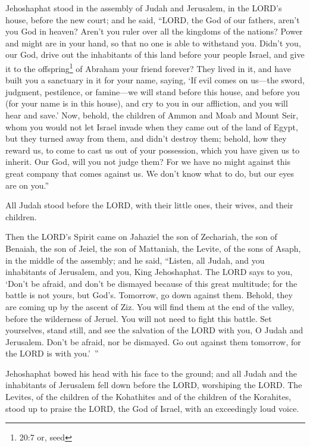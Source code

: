 \myverse{}Jehoshaphat stood in the assembly of Judah and Jerusalem, in the
LORD’s house, before the new court;
\myverse{}and he said, “LORD, the God of our fathers, aren’t you God in heaven? Aren’t
you ruler over all the kingdoms of the nations? Power and might are in your hand, so that no one is able
to withstand you.
\myverse{}Didn’t you, our God, drive out the inhabitants of this land before your people
Israel, and give it to the offspring\footnote{20:7 or, seed} of Abraham your friend forever?
\myverse{}They lived in it, and have built you a sanctuary in it for your name, saying,
\myverse{}‘If evil comes on us—the sword, judgment, pestilence, or famine—we will stand
before this house, and before you (for your name is in this house), and cry to you in our affliction,
and you will hear and save.’
\myverse{}Now, behold, the children of Ammon and Moab and Mount Seir, whom you would
not let Israel invade when they came out of the land of Egypt, but they turned away from them, and didn’t
destroy them;
\myverse{}behold, how they reward us, to come to cast us out of your possession, which
you have given us to inherit.
\myverse{}Our God, will you not judge them? For we have no might against this great
company that comes against us. We don’t know what to do, but our eyes are on you.”

\myverse{}All Judah stood before the LORD, with their little ones, their
wives, and their children.

\myverse{}Then the LORD’s Spirit came on Jahaziel the son of Zechariah,
the son of Benaiah, the son of Jeiel, the son of Mattaniah, the Levite, of the sons of Asaph, in the middle
of the assembly;
\myverse{}and he said, “Listen, all Judah, and you inhabitants of Jerusalem, and you,
King Jehoshaphat. The LORD says to you, ‘Don’t be afraid, and don’t be dismayed because of this great
multitude; for the battle is not yours, but God’s.
\myverse{}Tomorrow, go down against them. Behold, they are coming up by the ascent
of Ziz. You will find them at the end of the valley, before the wilderness of Jeruel.
\myverse{}You will not need to fight this battle. Set yourselves, stand still, and
see the salvation of the LORD with you, O Judah and Jerusalem. Don’t be afraid, nor be dismayed. Go out
against them tomorrow, for the LORD is with you.’ ”

\myverse{}Jehoshaphat bowed his head with his face to the ground; and
all Judah and the inhabitants of Jerusalem fell down before the LORD, worshiping the LORD.
\myverse{}The Levites, of the children of the Kohathites and of the children of the
Korahites, stood up to praise the LORD, the God of Israel, with an exceedingly loud voice.

